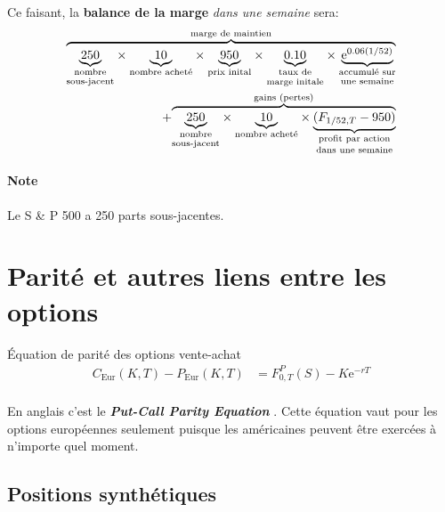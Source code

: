 \documentclass[10pt, french]{article}
\begin{document}
\begin{multicols*}{2}
\begin{algo2}[Exemple]
Ce faisant, la \colorbox{bleudefrance}{\textbf{balance de la marge}} \textit{dans une semaine} sera:
\setlength{\mathindent}{-1cm}
\begin{align*}
	\overset{\text{marge de maintien}}{\overbrace{
		\underset{\text{\shortstack{nombre\\ sous-jacent}}}{\underbrace{250}} \times
		\underset{\text{nombre acheté}}{\underbrace{10}} \times 
		\underset{\text{prix inital}}{\underbrace{950}} \times 
		\underset{\text{\shortstack{taux de\\ marge initale}}}{\underbrace{0.10}} \times 
		\underset{\text{\shortstack{accumulé sur\\ une semaine}}}{\underbrace{\textrm{e}^{0.06 (1/52)}}} 
		}} \\ 
		+ 
	\overset{\text{gains (pertes)}}{\overbrace{
		\underset{\text{\shortstack[c]{nombre\\ sous-jacent}}}{\underbrace{250}} \times
		\underset{\text{nombre acheté}}{\underbrace{10}} \times 
		\underset{\text{\shortstack[c]{profit par action\\ dans une semaine}}}{\underbrace{(F_{1/52, T} -  950)}}
		}}
\end{align*}
\setlength{\mathindent}{1cm}
\end{algo2}

\paragraph*{Note}	Le S \& P 500 a 250 parts sous-jacentes.

\newpage

\setcounter{section}{8}
\section{Parité et autres liens entre les options}
\begin{rappel}{Équation de parité des options vente-achat}
\begin{align*}
	C_{\text{Eur}}(K, T) - P_{\text{Eur}}(K, T)
	&=	F_{0, T}^{P}(S) - K\textrm{e}^{-rT}\\
\end{align*}

En anglais c'est le \og \textit{\textbf{Put-Call Parity Equation}} \fg{}. Cette équation vaut pour les options européennes seulement puisque les américaines peuvent être exercées à n'importe quel moment.
\end{rappel}

\subsection*{Positions synthétiques}


\end{multicols*}
\end{document}
